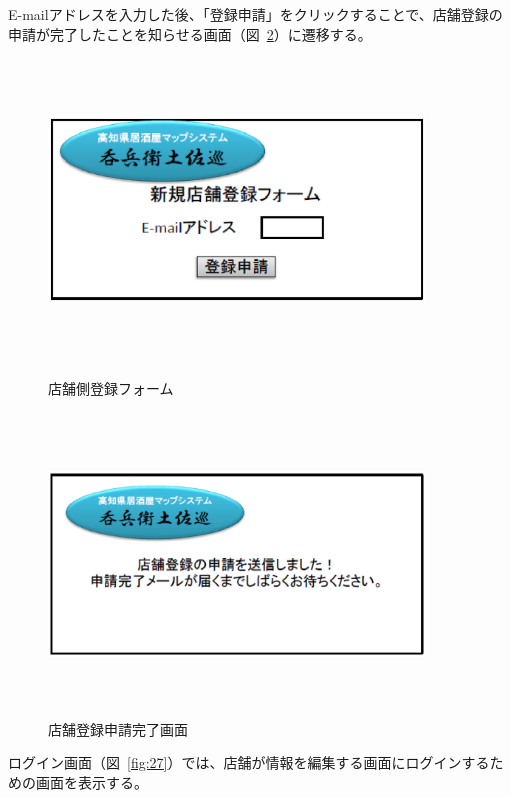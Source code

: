 \documentclass[a4j,titlepage]{jarticle}
\begin{document}
E-mailアドレスを入力した後、「登録申請」をクリックすることで、店舗登録の申請が完了したことを知らせる画面（図~\ref{fig:26}）に遷移する。



\begin {figure}[!htbp]
    \begin{center}
    \includegraphics [height=8cm, width=10cm]{25.eps}
　　    \caption {店舗側登録フォーム}
    \label {fig:25}
    \end{center}
\end {figure}



\begin {figure}[!htbp]
    \begin{center}
    \includegraphics [height=8cm, width=10cm]{26.eps}
    \caption {店舗登録申請完了画面}
    \label {fig:26}
    \end{center}
\end {figure}


\clearpage
ログイン画面（図~\ref{fig:27}）では、店舗が情報を編集する画面にログインするための画面を表示する。
\end{document}
